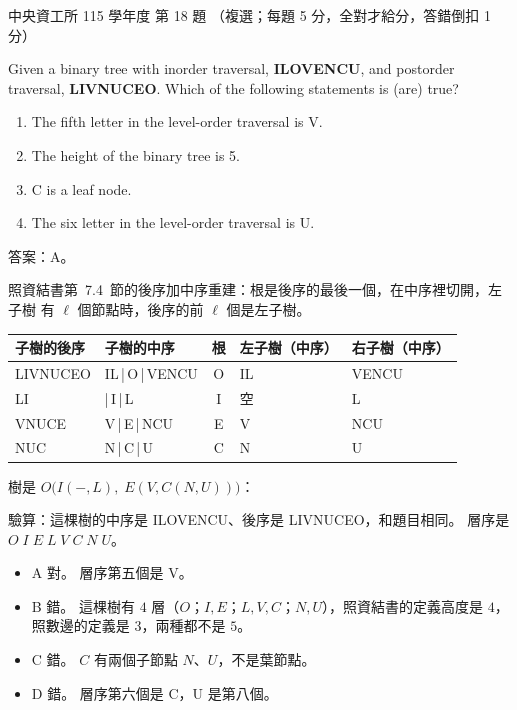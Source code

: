 \begin{pastexam}[label={px:ncu-115-dsa-18}]{中央資工所 115 學年度 第 18 題}
（複選；每題 5 分，全對才給分，答錯倒扣 1 分）

Given a binary tree with inorder traversal, \textbf{ILOVENCU}, and postorder traversal,
\textbf{LIVNUCEO}. Which of the following statements is (are) true?
\begin{enumerate}[label=\Alph*.]
\item The fifth letter in the level-order traversal is V.
\item The height of the binary tree is 5.
\item C is a leaf node.
\item The six letter in the level-order traversal is U.
\end{enumerate}
\end{pastexam}

\begin{pastsoln}
答案：A。

照資結書第~7.4~節的後序加中序重建：根是後序的最後一個，在中序裡切開，左子樹
有 $\ell$ 個節點時，後序的前 $\ell$ 個是左子樹。
\begin{center}
\begin{tabular}{llcll}
\toprule
子樹的後序 & 子樹的中序 & 根 & 左子樹（中序）& 右子樹（中序）\\
\midrule
LIVNUCEO & IL\,|\,O\,|\,VENCU & O & IL & VENCU \\
LI & |\,I\,|\,L & I & 空 & L \\
VNUCE & V\,|\,E\,|\,NCU & E & V & NCU \\
NUC & N\,|\,C\,|\,U & C & N & U \\
\bottomrule
\end{tabular}
\end{center}
樹是 $O\bigl(I(-, L),\; E(V, C(N, U))\bigr)$：
\begin{center}
\end{center}
驗算：這棵樹的中序是 ILOVENCU、後序是 LIVNUCEO，和題目相同。 層序是
$O\;I\;E\;L\;V\;C\;N\;U$。

\begin{itemize}
\item A 對。 層序第五個是 V。
\item B 錯。 這棵樹有 $4$ 層（$O$；$I, E$；$L, V, C$；$N, U$），照資結書的定義高度是
$4$，照數邊的定義是 $3$，兩種都不是 $5$。
\item C 錯。 $C$ 有兩個子節點 $N$、$U$，不是葉節點。
\item D 錯。 層序第六個是 C，U 是第八個。
\end{itemize}
\end{pastsoln}
